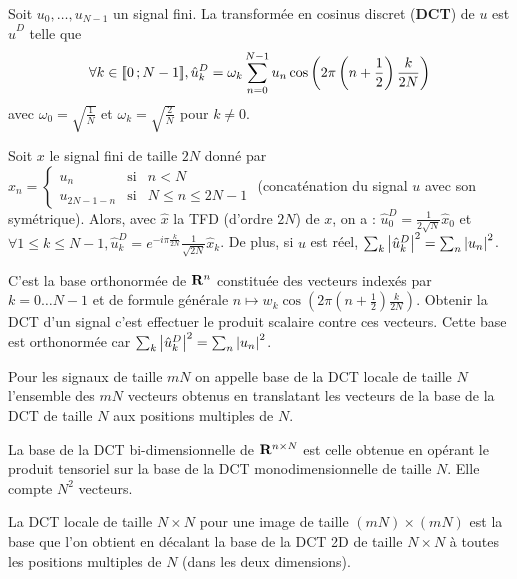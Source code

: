 \begin{defn}
	Soit $u_0,\ldots,u_{N - 1}$ un signal fini.
	La transformée en cosinus discret (\textbf{DCT}) de $u$ est $\hat{u}^D$ telle que
	\vspace{-0.15cm}$$
	\forall k \in \intiff{0}{N - 1}, \hat{u}^D_k = \omega_k \sum_{n = 0}^{N - 1} u_n \cos \left( 2\pi \left( n + \frac{1}{2} \right) \frac{k}{2N} \right)
	\vspace{-0.15cm}$$
	avec $\omega_0 = \sqrt{\frac{1}{N}}$ et $\omega_k = \sqrt{\frac{2}{N}}$ pour $k \neq 0$.
\end{defn}

\begin{pop}
	Soit $x$ le signal fini de taille $2N$ donné par
	$x_n = \left\{ \begin{array}{ccl}
		u_n & \text{si} & n < N \\
		u_{2N - 1 - n} & \text{si} & N \leq n \leq 2N - 1
	\end{array}\right .$
	(concaténation du signal $u$ avec son symétrique).
	Alors, avec $\hat{x}$ la TFD (d'ordre $2N$) de $x$, on a :
	$\hat{u}^D_0 = \frac{1}{2\sqrt{N}} \hat{x}_0$
	et $\forall 1 \leq k \leq N - 1, \hat{u}_k^D = e^{-i\pi \frac{k}{2N}} \frac{1}{\sqrt{2N}} \hat{x}_k$.
	De plus, si $u$ est réel, $\sum_k \left\lvert\hat{u}_k^D\right\rvert^2 = \sum_n \left\lvert u_n\right\rvert^2$.
\end{pop}

\begin{defn}
	C'est la base orthonormée de $\mathbf{R}^n$ constituée des vecteurs indexés par $k = 0 \ldots N-1$ et de formule générale
	$n \mapsto w_k \cos \left( 2\pi \left( n + \frac{1}{2} \right) \frac{k}{2N} \right)$.
	Obtenir la DCT d'un signal c'est effectuer le produit scalaire contre ces vecteurs.
	Cette base est orthonormée car $\sum_k \left\lvert\hat{u}_k^D\right\rvert^2 = \sum_n \left\lvert u_n\right\rvert^2$.
\end{defn}

\begin{defn}
	Pour les signaux de taille $mN$ on appelle base de la DCT locale de taille $N$ l'ensemble des $mN$ vecteurs obtenus en translatant les vecteurs de la base de la DCT de taille $N$ aux positions multiples de $N$.
\end{defn}

\begin{defn}
	La base de la DCT bi-dimensionnelle de $\mathbf{R}^{n \times N}$ est celle obtenue en opérant le produit tensoriel sur la base de la DCT monodimensionnelle de taille $N$.
	Elle compte $N^2$ vecteurs.
\end{defn}

\begin{defn}
	La DCT locale de taille $N \times N$ pour une image de taille $(mN) \times (mN)$ est la base que l'on obtient en décalant la base de la DCT 2D de taille $N \times N$ à toutes les positions multiples de $N$ (dans les deux dimensions).
\end{defn}